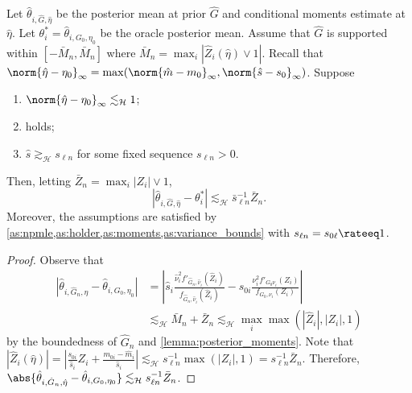 \documentclass[12pt, reqno]{amsart}
\newcommand{\absauto}[1]{\left| #1 \right|}
\newcommand{\Hyperparams}{\mathcal{H}}
\newcommand{\leH}{\lesssim_{\mathcal{H}}}
\newcommand{\hatm}{\hat m}
\newcommand{\hats}{\hat s}
\newcommand{\hateta}{\hat\eta}
\newcommand{\Dinfty}{\norm{\hateta - \eta_0}_{\infty}} %
\numberwithin{equation}{section}
\begin{document}
\begin{refsection}
\begin{appendices}
\begin{lemma}
Let $\hat \theta_{i, \hat G, \hateta}$ be the posterior mean at prior $\hat G$ and
conditional moments estimate at $\hateta$. Let $\theta_i^* = \hat\theta_{i, G_0, \eta_0}$
be the oracle posterior mean. Assume that $\hat G$ is supported within $[-\bar M_n, \bar
M_n]$ where $\bar M_n = \max_i |\hat Z_i(\hateta) \vee 1|$. Recall that $\Dinfty =
\max(\norm{\hatm-m_0}_\infty,
\norm{\hats - s_0}_\infty)$. Suppose
\begin{enumerate}
  \item $\Dinfty \leH 1$;
  \item {} holds;
  \item $\hats \gtrsim_{\Hyperparams} s_{\ell n}$ for some fixed sequence $s_{\ell n} > 0$.
\end{enumerate}
Then, letting $\bar Z_n = \max_i |Z_i| \vee 1$, \[
\absauto{\hat \theta_{i, \hat G, \hateta} - \theta_i^*} \leH \bar s_{\ell n}^{-1} \bar Z_n
.\]
Moreover, the assumptions are satisfied by
\cref{as:npmle,as:holder,as:moments,as:variance_bounds}
with $s_{\ell n} = s_{0\ell} \rateeq 1$.
\end{lemma}
\begin{proof}
Observe that \begin{align*}
\absauto{
    \hat\theta_{i, \hat G_n, \hateta} - \hat\theta_{i, G_0, \eta_0}
} &=  \absauto{
    \hat s_i \frac{\hat\nu_i^2 f'_{\hat G_n, \hat\nu_i}(\hat Z_i)}{ f_{\hat G_n,
    \hat\nu_i}(\hat Z_i)} - s_{0i}
    \frac{\nu_i^2 f'_{G_0 \nu_i}(Z_i)}{f_{G_0, \nu_i}(Z_i)}
} \\
&\leH  \bar M_n + \bar Z_n \leH \max_i \max(|\hat Z_i|, |Z_i|, 1)
\end{align*}
by the boundedness of $\hat G_n$ and 
\cref{lemma:posterior_moments}.
Note that $|\hat Z_i(\hateta)| = \absauto{\frac{s_{0i}}{\hats_i} Z_i + \frac{m_{0i} -
\hatm_i}
{\hats_i}} \leH s_{\ell n}^{-1} \max(|Z_i|, 1) = s_{\ell n}^{-1} \bar Z_n.$  Therefore, $
\abs{
    \hat\theta_{i, \hat G_n, \hateta} - \hat\theta_{i, G_0, \eta_0}
} \leH s_{\ell n}^{-1} \bar Z_n
$.
\end{proof}


\end{appendices}
\end{refsection}
\end{document}
